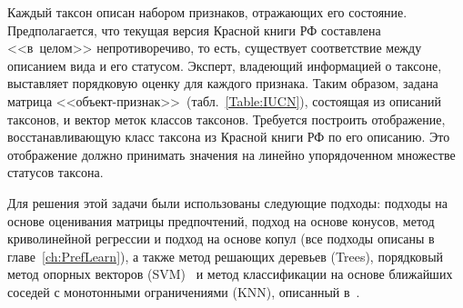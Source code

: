 \documentclass{elsarticle}
\begin{document}
Каждый таксон описан набором признаков, отражающих его состояние. Предполагается, что текущая версия Красной книги РФ составлена <<в~целом>> непротиворечиво, то есть, существует соответствие между описанием вида и его статусом. Эксперт, владеющий информацией о таксоне, выставляет порядковую оценку для каждого признака. Таким образом, задана матрица <<объект-признак>>~(табл.~\ref{Table:IUCN}), состоящая из описаний таксонов, и вектор меток классов таксонов.
Требуется построить отображение, восстанавливающую класс таксона из Красной книги РФ по его описанию. Это отображение должно принимать значения на линейно упорядоченном множестве статусов таксона.

%

Для решения этой задачи были использованы следующие подходы: подходы на основе оценивания матрицы предпочтений, подход на основе конусов, метод криволинейной регрессии и подход на основе копул (все подходы описаны в главе~\ref{ch:PrefLearn}), а также метод решающих деревьев (Trees), порядковый метод опорных векторов (SVM)~\cite{frank2001simple} и метод классификации на основе ближайших соседей с монотонными ограничениями (KNN), описанный в~\cite{duivesteijn2008knn}.
\end{document}
